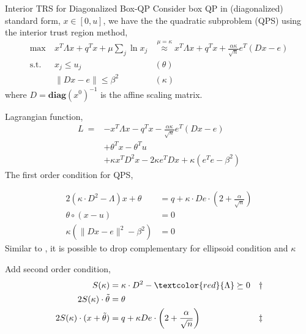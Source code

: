 \documentclass{beamerswitch}
\newcommand{\diag}{\textbf{diag}}
\newcommand{\st}{\mathrm{s.t.\;}}
\newcommand{\red}[1]{\textcolor{red}{#1}}
\begin{document}
\begin{frame}[allowframebreaks]{Interior TRS for Diagonalized Box-QP}
  Consider box QP in (diagonalized) standard form, \(x \in [0, u]\), we have the the quadratic subproblem (QPS) using the interior trust region method,
  \begin{equation}\label{eq.interior.boxqp}
    \begin{aligned}
      \max ~ & x^T\Lambda x + q^Tx  + \mu \sum_j \ln x_j & \stackrel{\mu =\kappa}{\approx} x^T\Lambda x + q^Tx + \frac{\alpha \kappa}{\sqrt n} e^T(Dx-e) \\
      \st ~  & x_j \le u_j                               & (\theta)                                                                                      \\
             & \|Dx - e\| \le \beta^2                    & (\kappa)
    \end{aligned}
  \end{equation}
  where \(D = \diag(x^0)^{-1}\) is the affine scaling matrix.
  \framebreak

  Lagrangian function,
  \begin{align*}
    L ~ = & -x^T\Lambda x - q^Tx - \frac{\alpha \kappa}{\sqrt n} e^T(Dx-e) \\
          & + \theta^Tx - \theta^Tu                                        \\
          & + \kappa x^TD^2x - 2\kappa e^TDx + \kappa(e^Te - \beta^2)
  \end{align*}
  The first order condition for QPS,

  \begin{align*}
    2(\kappa \cdot D^2 - \Lambda)x + \theta         & = q + \kappa \cdot De \cdot\left (2 + \frac{\alpha}{\sqrt n} \right ) \\
    \theta \circ (x - u)                            & = 0                                                                   \\
    \kappa \left (\|Dx - e\|^2 - \beta^2   \right ) & = 0
  \end{align*}
  Similar to \cite{ye_extension_1989}, it is possible to drop complementary for ellipsoid condition and \(\kappa\)

  \framebreak
  Add second order condition,
  \begin{align*}
    S(\kappa)                             & = \kappa \cdot D^2 - \red{\Lambda} \succeq 0                    & \dagger  \\
    2S (\kappa) \cdot \tilde \theta       & = \theta                                                        &          \\
    2S (\kappa) \cdot (x + \tilde \theta) & = q + \kappa De\cdot \left (2 + \frac{\alpha}{\sqrt n} \right ) & \ddagger \\
  \end{align*}


\end{frame}
\end{document}
